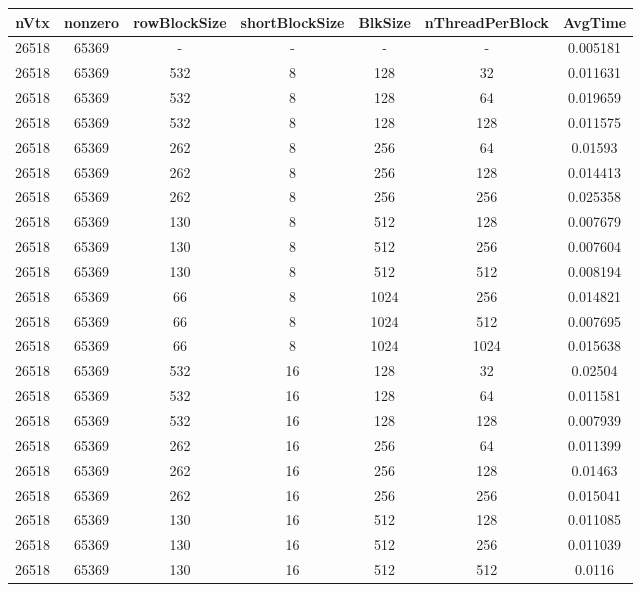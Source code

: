 \documentclass[9pt]{article}
\begin{document}
\SetBgPosition{0.25cm,-5.0cm}
\begin{tabular}{|c|c|c|c|c|c|c| }  
\hline
nVtx  & nonzero  & rowBlockSize  & shortBlockSize  & BlkSize  & nThreadPerBlock  & AvgTime \\
\hline
26518  & 65369  &  -  & -  & -  & -  &0.005181 \\
\hline
26518  & 65369  & 532  & 8  & 128  & 32  & 0.011631 \\
\hline
26518  & 65369  & 532  & 8  & 128  & 64  & 0.019659 \\
\hline
26518  & 65369  & 532  & 8  & 128  & 128  & 0.011575 \\
\hline
26518  & 65369  & 262  & 8  & 256  & 64  & 0.01593 \\
\hline
26518  & 65369  & 262  & 8  & 256  & 128  & 0.014413 \\
\hline
26518  & 65369  & 262  & 8  & 256  & 256  & 0.025358 \\
\hline
26518  & 65369  & 130  & 8  & 512  & 128  & 0.007679 \\
\hline
26518  & 65369  & 130  & 8  & 512  & 256  & 0.007604 \\
\hline
26518  & 65369  & 130  & 8  & 512  & 512  & 0.008194 \\
\hline
26518  & 65369  & 66  & 8  & 1024  & 256  & 0.014821 \\
\hline
26518  & 65369  & 66  & 8  & 1024  & 512  & 0.007695 \\
\hline
26518  & 65369  & 66  & 8  & 1024  & 1024  & 0.015638 \\
\hline
26518  & 65369  & 532  & 16  & 128  & 32  & 0.02504 \\
\hline
26518  & 65369  & 532  & 16  & 128  & 64  & 0.011581 \\
\hline
26518  & 65369  & 532  & 16  & 128  & 128  & 0.007939 \\
\hline
26518  & 65369  & 262  & 16  & 256  & 64  & 0.011399 \\
\hline
26518  & 65369  & 262  & 16  & 256  & 128  & 0.01463 \\
\hline
26518  & 65369  & 262  & 16  & 256  & 256  & 0.015041 \\
\hline
26518  & 65369  & 130  & 16  & 512  & 128  & 0.011085 \\
\hline
26518  & 65369  & 130  & 16  & 512  & 256  & 0.011039 \\
\hline
26518  & 65369  & 130  & 16  & 512  & 512  & 0.0116 \\

\end{tabular}
\end{document}
